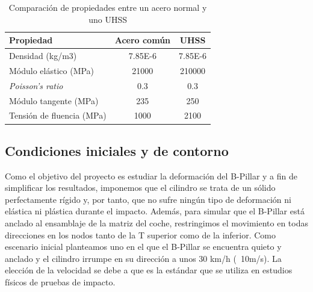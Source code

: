 \documentclass[11pt]{article} %
\begin{document}
\begin{table}[H]
  \centering
  \begin{tabular}{lcc}
    \toprule
    Propiedad & Acero común & UHSS \\
    \midrule
    Densidad (kg/m3)           & 7.85E-6  &  7.85E-6\\
    Módulo elástico (MPa)           & 21000   &  210000\\
    \textit{Poisson's ratio}        & 0.3  & 0.3 \\
    Módulo tangente (MPa)   & 235  & 250 \\
    Tensión de fluencia (MPa) & 1000  & 2100 \\
    \bottomrule
  \end{tabular}
  \caption{Comparación de propiedades entre un acero normal y uno UHSS}\label{tab:materiales}
\end{table}



\subsection{Condiciones iniciales y de contorno}
Como el objetivo del proyecto es estudiar la deformación del B-Pillar y a fin de simplificar los resultados, imponemos que el cilindro se trata de un sólido perfectamente rígido y, por 
tanto, que no sufre ningún tipo de deformación ni elástica ni plástica durante el impacto. Además, para simular que el B-Pillar está anclado al ensamblaje de la matriz del coche, restringimos
el movimiento en todas direcciones en los nodos tanto de la T superior como de la inferior.
Como escenario inicial planteamos uno en el que el B-Pillar se encuentra quieto y anclado y el cilindro irrumpe en su dirección a unos 30 km/h (~10m/s). La elección de la velocidad se debe a que es la 
estándar que se utiliza en estudios físicos de pruebas de impacto.
\end{document}
